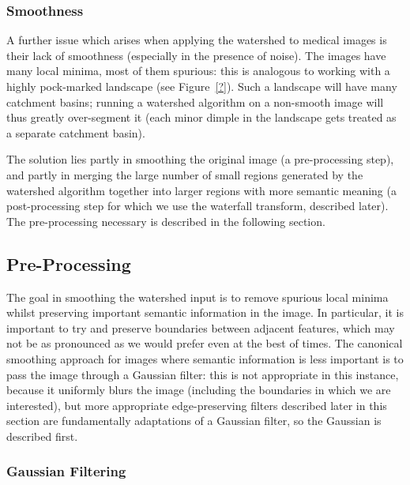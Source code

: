 
\subsubsection{Smoothness}

A further issue which arises when applying the watershed to medical images is their lack of smoothness (especially in the presence of noise). The images have many local minima, most of them spurious: this is analogous to working with a highly pock-marked landscape (see Figure~\ref{?}). Such a landscape will have many catchment basins; running a watershed algorithm on a non-smooth image will thus greatly over-segment it (each minor dimple in the landscape gets treated as a separate catchment basin).


The solution lies partly in smoothing the original image (a pre-processing step), and partly in merging the large number of small regions generated by the watershed algorithm together into larger regions with more semantic meaning (a post-processing step for which we use the waterfall transform, described later). The pre-processing necessary is described in the following section.

\subsection{Pre-Processing}

The goal in smoothing the watershed input is to remove spurious local minima whilst preserving important semantic information in the image. In particular, it is important to try and preserve boundaries between adjacent features, which may not be as pronounced as we would prefer even at the best of times. The canonical smoothing approach for images where semantic information is less important is to pass the image through a Gaussian filter: this is not appropriate in this instance, because it uniformly blurs the image (including the boundaries in which we are interested), but more appropriate edge-preserving filters described later in this section are fundamentally adaptations of a Gaussian filter, so the Gaussian is described first.

\subsubsection{Gaussian Filtering}

